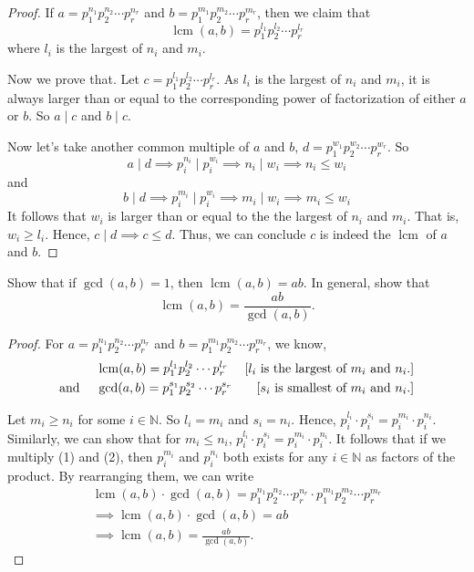 \documentclass[12pt]{article}
\newenvironment{exercise}[2][Exercise]{\begin{trivlist}
\item[\hskip \labelsep {\bfseries #1}\hskip \labelsep {\bfseries #2.}]}{\end{trivlist}}
\DeclareMathOperator{\lcm}{lcm}
\begin{document}
\begin{proof}
	If $a=p_1^{n_1} p_2^{n_2} \cdots p_r^{n_r}$ and $b = p_1^{m_1} p_2^{m_2} \cdots p_r^{m_r}$, then we claim that
	\[
		\lcm(a,b) = p_1^{l_1} p_2^{l_2} \cdots p_r^{l_r}
	\]
	where $l_i$ is the largest of $n_i$ and $m_i$.

	Now we prove that. Let $c=p_1^{l_1} p_2^{l_2} \cdots p_r^{l_r}$. As $l_i$ is the largest of $n_i$ and $m_i$, it is always larger than or equal to the corresponding power of factorization of either $a$ or $b$. So $a\mid c$ and $b\mid c$.

	Now let's take another common multiple of $a$ and $b$, $d=p_1^{w_1} p_2^{w_2} \cdots p_r^{w_r}$. So
	\[
		a \mid d \implies p_i^{n_i} \mid p_i^{w_i} \implies n_i \mid w_i \implies n_i \leq w_i
	\]
	and
	\[
		b \mid d \implies p_i^{m_i} \mid p_i^{w_i} \implies m_i \mid w_i \implies m_i \leq w_i
	\]
	It follows that $w_i$ is larger than or equal to the the largest of $n_i$ and $m_i$. That is, $w_i \geq l_i$. Hence, $c \mid d \implies c\leq d$. Thus, we can conclude $c$ is indeed the $\lcm$ of $a$ and $b$.
\end{proof}

\begin{exercise}{12}
	Show that if \( \gcd(a, b) = 1 \), then \( \lcm(a, b) = ab \). In general, show that \[ \lcm(a, b) = \frac{ab}{\gcd(a, b)}. \]
\end{exercise}

\begin{proof}
	For $a=p_1^{n_1} p_2^{n_2} \cdots p_r^{n_r}$ and $b = p_1^{m_1} p_2^{m_2} \cdots p_r^{m_r}$, we know,
	\begin{align}
		                 & \lcm(a,b) = p_1^{l_1} p_2^{l_2} \cdots p_r^{l_r}  & \text{[$l_i$ is the largest of $m_i$ and $n_i$.]} \\
		\text{and \quad} & \gcd(a, b) = p_1^{s_1} p_2^{s_2} \cdots p_r^{s_r} & \text{[$s_i$ is smallest of $m_i$ and $n_i$.]}
	\end{align}

	Let $m_i \geq n_i$ for some $i \in \mathbb{N}$. So $l_i=m_i$ and $s_i=n_i$. Hence, $p_i^{l_i}\cdot p_i^{s_i} = p_i^{m_i}\cdot p_i^{n_i}$. Similarly, we can show that for $m_i\leq n_i$, $p_i^{l_i}\cdot p_i^{s_i} = p_i^{m_i}\cdot p_i^{n_i}$. It follows that if we multiply (1) and (2), then $p_i^{m_i}$ and $p_i^{n_i}$ both exists for any $i\in \mathbb{N}$ as factors of the product. By rearranging them, we can write
	\begin{gather*}
		\lcm(a,b)\cdot \gcd(a,b)=p_1^{n_1} p_2^{n_2} \cdots p_r^{n_r}\cdot p_1^{m_1} p_2^{m_2} \cdots p_r^{m_r}\\
		\implies \lcm(a,b)\cdot \gcd(a,b) = ab \\
		\implies \lcm(a, b) = \frac{ab}{\gcd(a, b)}.
	\end{gather*}
\end{proof}
\end{document}
